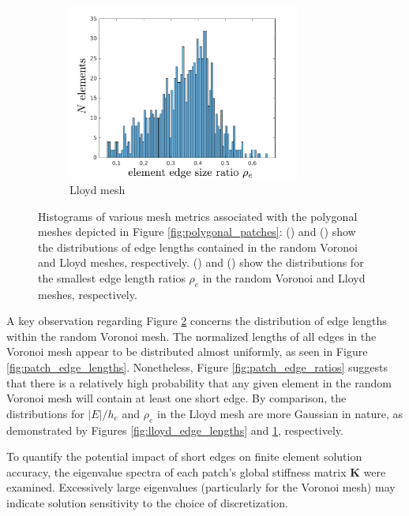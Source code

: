 \begin{figure}[!h]
\begin{subfigure}[b]{0.49\linewidth}
    \end{subfigure}
	\begin{subfigure}[b]{0.49\linewidth}
            \centering
            \includegraphics[width=3.0in]{figures/lloyd_edge_ratios.pdf}
    			\caption{Lloyd mesh \label{fig:lloyd_edge_ratios}}
    \end{subfigure}
    \caption{Histograms of various mesh metrics associated with the polygonal meshes depicted in Figure \ref{fig:polygonal_patches}:  () and () show the distributions of edge lengths contained in the random Voronoi and Lloyd meshes, respectively. () and () show the distributions for the smallest edge length ratios $\rho_e$ in the random Voronoi and Lloyd meshes, respectively.}
    \label{fig:patch_edge_metrics}
\end{figure}

A key observation regarding Figure \ref{fig:patch_edge_metrics} concerns the distribution of edge lengths within the random Voronoi mesh. The normalized lengths of all edges in the Voronoi mesh appear to be distributed almost uniformly, as seen in Figure \ref{fig:patch_edge_lengths}. Nonetheless, Figure \ref{fig:patch_edge_ratios} suggests that there is a relatively high probability that any given element in the random Voronoi mesh will contain at least one short edge. By comparison, the distributions for $|E|/h_e$ and $\rho_e$ in the Lloyd mesh are more Gaussian in nature, as demonstrated by Figures \ref{fig:lloyd_edge_lengths} and \ref{fig:lloyd_edge_ratios}, respectively.

To quantify the potential impact of short edges on finite element solution accuracy, the eigenvalue spectra of each patch's global stiffness matrix $\mathbf{K}$ were examined. Excessively large eigenvalues (particularly for the Voronoi mesh) may indicate solution sensitivity to the choice of discretization.

